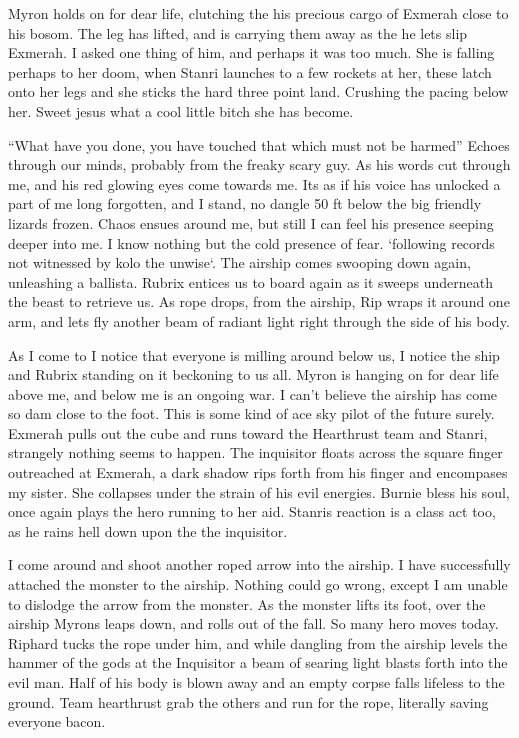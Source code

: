 \begin{multicols}{2}
Myron holds on for dear life, clutching the his precious cargo of Exmerah close to his bosom. The leg has lifted, and is carrying them away as the he lets slip Exmerah. I asked one thing of him, and perhaps it was too much. She is falling perhaps to her doom, when Stanri launches to a few rockets at her, these latch onto her legs and she sticks the hard three point land. Crushing the pacing below her. Sweet jesus what a cool little bitch she has become.\medskip

“What have you done, you have touched that which must not be harmed” Echoes through our minds, probably from the freaky scary guy. As his words cut through me, and his red glowing eyes come towards me. Its as if his voice has unlocked a part of me long forgotten, and I stand, no dangle 50 ft below the big friendly lizards frozen. Chaos ensues around me, but still I can feel his presence seeping deeper into me. I know nothing but the cold presence of fear. `following records not witnessed by kolo the unwise`. The airship comes swooping down again, unleashing a ballista. Rubrix entices us to board again as it sweeps underneath the beast to retrieve us. As rope drops, from the airship, Rip wraps it around one arm, and lets fly another beam of radiant light right through the side of his body.\medskip

As I come to I notice that everyone is milling around below us, I notice the ship and Rubrix standing on it beckoning to us all. Myron is hanging on for dear life above me, and below me is an ongoing war. I can’t believe the airship has come so dam close to the foot. This is some kind of ace sky pilot of the future surely. Exmerah pulls out the cube and runs toward the Hearthrust team and Stanri, strangely nothing seems to happen. The inquisitor floats across the square finger outreached at Exmerah, a dark shadow rips forth from his finger and encompases my sister. She collapses under the strain of his evil energies. Burnie bless his soul, once again plays the hero running to her aid. Stanris reaction is a class act too, as he rains hell down upon the the inquisitor.\medskip

I come around and shoot another roped arrow into the airship. I have successfully attached the monster to the airship. Nothing could go wrong, except I am unable to dislodge the arrow from the monster. As the monster lifts its foot, over the airship Myrons leaps down, and rolls out of the fall. So many hero moves today. Riphard tucks the rope under him, and while dangling from the airship levels the hammer of the gods at the Inquisitor a beam of searing light blasts forth into the evil man. Half of his body is blown away and an empty corpse falls lifeless to the ground. Team hearthrust grab the others and run for the rope, literally saving everyone bacon.\medskip


\end{multicols}
